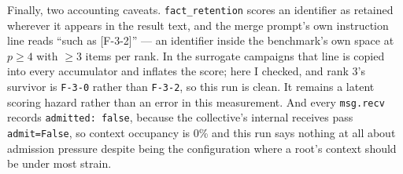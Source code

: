 \documentclass[11pt]{article}
\begin{document}
Finally, two accounting caveats. \texttt{fact\_retention} scores an identifier as retained
wherever it appears in the result text, and the merge prompt's own instruction line reads
``such as [F-3-2]'' --- an identifier inside the benchmark's own space at $p\ge4$ with
$\ge3$ items per rank. In the surrogate campaigns that line is copied into every
accumulator and inflates the score; here I checked, and rank 3's survivor is
\texttt{F-3-0} rather than \texttt{F-3-2}, so this run is clean. It remains a latent
scoring hazard rather than an error in this measurement. And every \texttt{msg.recv}
records \texttt{admitted: false}, because the collective's internal receives pass
\texttt{admit=False}, so context occupancy is 0\% and this run says nothing at all about
admission pressure despite being the configuration where a root's context should be under
most strain.
\end{document}

